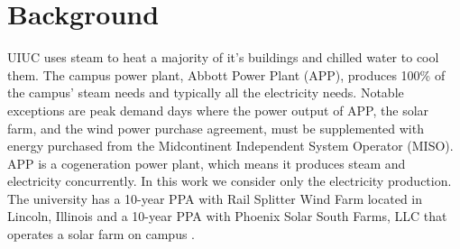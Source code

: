\section{Background}

UIUC uses steam to heat a majority of it's buildings and chilled water to cool them. The campus power plant, Abbott Power Plant (APP), produces 100\% of the campus' steam needs and typically all the electricity needs. Notable exceptions are peak demand days where the power output of APP, the solar farm, and the wind power purchase agreement, must be supplemented with energy purchased from the Midcontinent Independent System Operator (MISO). APP is a cogeneration power plant, which means it produces steam and electricity concurrently. In this work we consider only the electricity production. The university has a 10-year PPA with Rail Splitter Wind Farm located in Lincoln, Illinois and a 10-year PPA with Phoenix Solar South Farms, LLC that operates a solar farm on campus \cite{breitweiser_wind_2016,white_solar_2017}. 